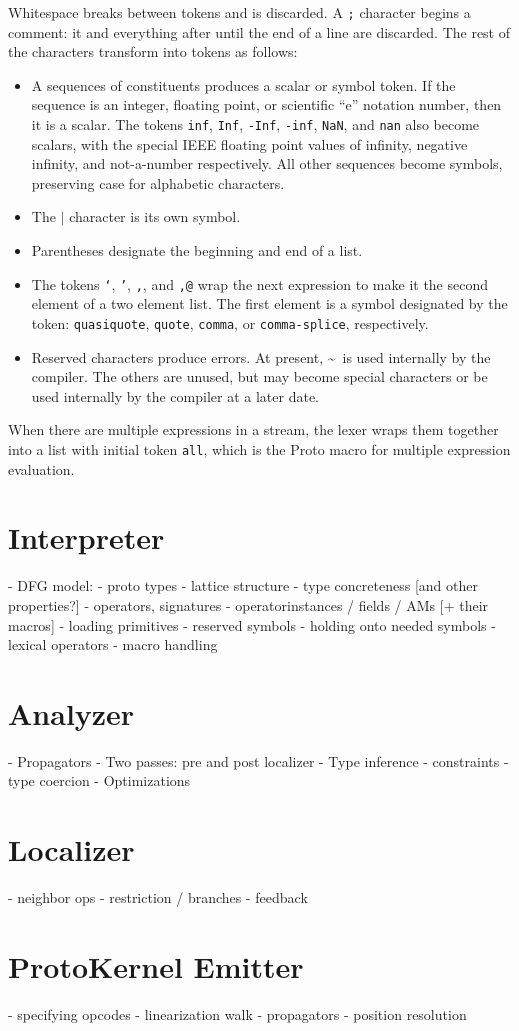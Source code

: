 \documentclass{article}
\begin{document}
Whitespace breaks between tokens and is discarded.  A {\tt ;} character
begins a comment: it and everything after until the end of a line are
discarded.  The rest of the characters transform into tokens as follows:
\begin{itemize}
  \item A sequences of constituents produces a scalar or symbol token.  If the
  sequence is an integer, floating point, or scientific ``e'' notation number,
  then it is a scalar.  The tokens {\tt inf}, {\tt Inf}, {\tt -Inf}, {\tt -inf},
  {\tt NaN}, and {\tt nan} also become scalars, with the special IEEE
  floating point values of infinity, negative infinity, and not-a-number
  respectively.  All other sequences become symbols, preserving case for
  alphabetic characters.
  \item The {\tt $|$} character is its own symbol.
  \item Parentheses designate the beginning and end of a list.
  \item The tokens {\tt `}, {\tt '}, {\tt ,}, and {\tt ,@} wrap the next
  expression to make it the second element of a two element list.  The first
  element is a symbol designated by the token: {\tt quasiquote}, {\tt quote}, 
  {\tt comma}, or {\tt comma-splice}, respectively.
  \item Reserved characters produce errors.  At present, \textasciitilde~is
  used internally by the compiler.  The others are unused, but may become
  special characters or be used internally by the compiler at a later date.
\end{itemize}

When there are multiple expressions in a stream, the lexer wraps them together
into a list with initial token {\tt all}, which is the Proto macro for multiple
expression evaluation.

\section{Interpreter}
- DFG model:
 - proto types
  - lattice structure
  - type concreteness [and other properties?]
 - operators, signatures
 - operatorinstances / fields / AMs [+ their macros]
- loading primitives
- reserved symbols
- holding onto needed symbols
- lexical operators
- macro handling

\section{Analyzer}
- Propagators
- Two passes: pre and post localizer
- Type inference
  - constraints
  - type coercion
- Optimizations

\section{Localizer}
- neighbor ops
- restriction / branches
- feedback

\section{ProtoKernel Emitter}
- specifying opcodes
- linearization walk
- propagators
- position resolution
\end{document}
